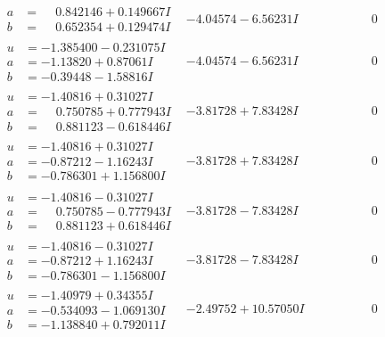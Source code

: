 \documentclass[1p]{elsarticle_modified}
\theoremstyle{definition}
\begin{document}
$$\begin{array}{c|c|c}
\begin{aligned}
a &= \phantom{-}0.842146 + 0.149667 I \\
b &= \phantom{-}0.652354 + 0.129474 I\end{aligned}
 & -4.04574 - 6.56231 I & \phantom{-0.000000 } 0 \\ \hline\begin{aligned}
u &= -1.385400 - 0.231075 I \\
a &= -1.13820 + 0.87061 I \\
b &= -0.39448 - 1.58816 I\end{aligned}
 & -4.04574 - 6.56231 I & \phantom{-0.000000 } 0 \\ \hline\begin{aligned}
u &= -1.40816 + 0.31027 I \\
a &= \phantom{-}0.750785 + 0.777943 I \\
b &= \phantom{-}0.881123 - 0.618446 I\end{aligned}
 & -3.81728 + 7.83428 I & \phantom{-0.000000 } 0 \\ \hline\begin{aligned}
u &= -1.40816 + 0.31027 I \\
a &= -0.87212 - 1.16243 I \\
b &= -0.786301 + 1.156800 I\end{aligned}
 & -3.81728 + 7.83428 I & \phantom{-0.000000 } 0 \\ \hline\begin{aligned}
u &= -1.40816 - 0.31027 I \\
a &= \phantom{-}0.750785 - 0.777943 I \\
b &= \phantom{-}0.881123 + 0.618446 I\end{aligned}
 & -3.81728 - 7.83428 I & \phantom{-0.000000 } 0 \\ \hline\begin{aligned}
u &= -1.40816 - 0.31027 I \\
a &= -0.87212 + 1.16243 I \\
b &= -0.786301 - 1.156800 I\end{aligned}
 & -3.81728 - 7.83428 I & \phantom{-0.000000 } 0 \\ \hline\begin{aligned}
u &= -1.40979 + 0.34355 I \\
a &= -0.534093 - 1.069130 I \\
b &= -1.138840 + 0.792011 I\end{aligned}
 & -2.49752 + 10.57050 I & \phantom{-0.000000 } 0 \\ \hline\begin{aligned}

\end{aligned}
\end{array}$$
\end{document}
